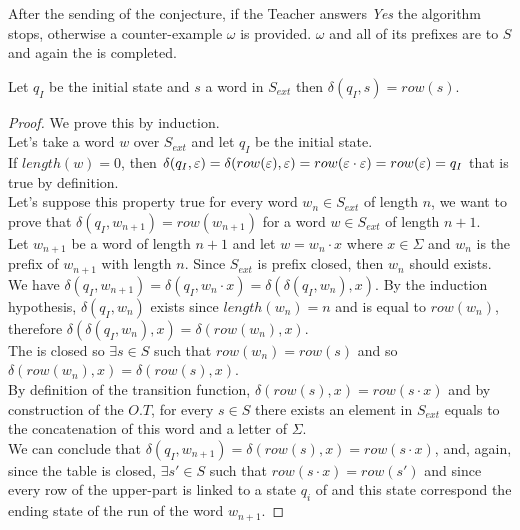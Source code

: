 After the sending of the conjecture, if the Teacher answers \textit{Yes} the algorithm stops, otherwise a counter-example $\omega$ is provided. $\omega$ and all of its prefixes are to $S$ and again the \OT is completed.

\begin{lemma}
  \label{lemma:L_trans_from_QI}
  Let $q_I$ be the initial state and $s $ a word in $S_{ext}$ then $\delta(q_I, s) = row(s)$.
\end{lemma}

\begin{proof}
  We prove this by induction.\\
  Let's take a word $w$ over $S_{ext}$ and let $q_I$ be the initial state. \\
  If $length(w) = 0$, then $\delta(q_I, \varepsilon) = \delta(row(\varepsilon), \varepsilon) =  row(\varepsilon \cdot \varepsilon) = row(\varepsilon) = q_I$ that is true by definition.\\
  Let's suppose this property true for every word $w_n \in S_{ext}$ of length $n$, we want to prove that $\delta(q_I, w_{n+1}) = row(w_{n+1})$ for a word $w \in S_{ext}$ of length $n+1$.\\
  Let $w_{n+1}$ be a word of length $n+1$ and let $w = w_n \cdot x$ where $x \in \Sigma$ and $w_n$ is the prefix of $w_{n+1}$ with length $n$. Since $S_{ext}$ is prefix closed, then $w_n$ should exists.\\
  We have $\delta(q_I, w_{n+1}) = \delta(q_I, w_n \cdot x) = \delta(\delta(q_I, w_n), x)$. By the induction hypothesis, $\delta(q_I, w_n)$ exists since $length(w_n) = n$ and is equal to $row(w_n)$, therefore $\delta(\delta(q_I, w_n), x) = \delta(row(w_n), x)$. \\
  The \OT is closed so $\exists s \in S$ such that $row(w_n) = row(s)$ and so $\delta(row(w_n), x) = \delta(row(s), x)$.\\
  By definition of the transition function, $\delta(row(s), x) = row(s \cdot x)$ and by construction of the $O.T$, for every $s \in S$ there exists an element in $S_{ext}$ equals to the concatenation of this word and a letter of $\Sigma$.\\
  We can conclude that $\delta(q_I, w_{n+1}) = \delta(row(s), x) = row(s \cdot x)$, and, again, since the table is closed, $\exists s' \in S$ such that $row(s \cdot x) = row(s')$ and since every row of the upper-part is linked to a state $q_i$ of \automaton{} and this state correspond the ending state of the run of the word $w_{n+1}$.
\end{proof}

